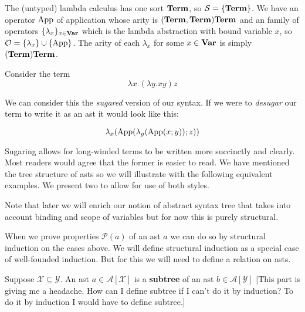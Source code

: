 \begin{example}
    The (untyped) lambda calculus has one sort $\mathbf{Term}$, so $\mathcal{S} = \{ \mathbf{Term} \} $. We have an operator $\text{App}$ of application whose arity is $(\mathbf{Term}, \mathbf{Term})\mathbf{Term}$ and an family of operators $\{\lambda_x \}_{x \in \mathbf{Var}}$ which is the lambda abstraction with bound variable $x$, so $\mathcal{O} = \{ \lambda_x \} \cup \{ \text{App} \} $. The arity of each $\lambda_x$ for some $x \in \mathbf{Var}$ is simply $(\mathbf{Term}) \mathbf{Term}$.
    
    Consider the term $$\lambda x . (\lambda y . x y)  z$$

    We can consider this the \textit{sugared} version of our syntax. If we were to \textit{desugar} our term to write it as an ast it would look like this:

    $$
        \lambda_x(\text{App}(\lambda_y(\text{App}(x ; y)); z) )
    $$

    Sugaring allows for long-winded terms to be written more succinctly and clearly. Most readers would agree that the former is easier to read. We have mentioned the tree structure of asts so we will illustrate with the following equivalent examples. We present two to allow for use of both styles.
    
    
    
\end{example}

\begin{remark}
    Note that later we will enrich our notion of abstract syntax tree that takes into account binding and scope of variables but for now this is purely structural.
\end{remark}


\begin{remark}
    When we prove properties $\mathcal{P}(a)$ of an ast $a$ we can do so by structural induction on the cases above. We will define structural induction as a special case of well-founded induction. But for this we will need to define a relation on asts.
\end{remark}

\begin{defin}
    Suppose $\mathcal{X} \subseteq \mathcal{Y}$. An ast $a \in \mathcal{A}[\mathcal{X}]$ is a \textbf{subtree} of an ast $b \in \mathcal{A}[\mathcal{Y}]$ [This part is giving me a headache. How can I define subtree if I can't do it by induction? To do it by induction I would have to define subtree.]
\end{defin}



